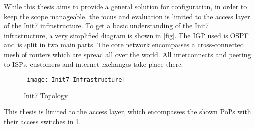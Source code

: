 While this thesis aims to provide a general solution for configuration, in order to keep the scope manageable, the focus
and evaluation is limited to the access layer of the Init7 infrastructure.
To get a basic understanding of the Init7 infrastructure, a very simplified diagram is shown in [fig]. The \acrfull{IGP} used is
\acrshort{OSPF} and is split in two main parts. The core network encompasses a cross-connected mesh of routers which are spread all
over the world. All interconnects and peering to ISPs, customers and internet exchanges take place there. 

\begin{figure}[h]
  \centering
  \texttt{[image: Init7-Infrastructure]}
  \caption{Init7 Topology}
  \label{fig:topology}
\end{figure}

This thesis is limited to the access layer, which encompasses the shown PoPs with their access switches in \ref{fig:topology}.



